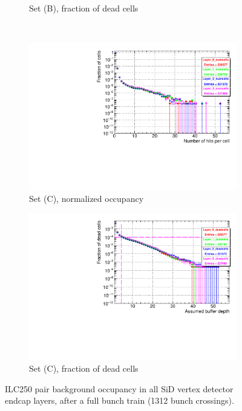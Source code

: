 \begin{figure}[htb]
\begin{subfigure}[b]{0.49\textwidth}
   \caption{Set (B), fraction of dead cells}
   \end{subfigure}\\
     \begin{subfigure}[b]{0.49\textwidth}
   \centering
    \includegraphics[width=\textwidth]{Figures/Pairs/Appendix/occupancy_numcells_SiVertexEndcap_ILC250_SetC.pdf}
   \caption{Set (C), normalized occupancy}
   \end{subfigure}
   \hfill
    \begin{subfigure}[b]{0.49\textwidth}
   \centering
    \includegraphics[width=\textwidth]{Figures/Pairs/Appendix/occupancy_deadcells_SiVertexEndcap_ILC250_SetC.pdf}
   \caption{Set (C), fraction of dead cells}
   \end{subfigure}
   \caption[Pair background occupancy in all SiD vertex detector endcap layers for the ILC250]{ILC250 pair background occupancy in all SiD vertex detector endcap layers, after a full bunch train (1312 bunch crossings).
}
\end{figure}
